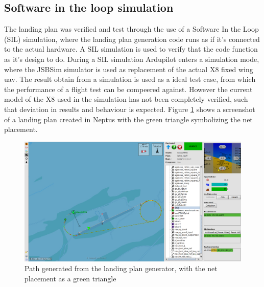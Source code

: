 \subsection{Software in the loop simulation}
The landing plan was verified and test through the use of a Software In the Loop (SIL) simulation, where the landing plan generation code runs as if it's connected to the actual hardware. A SIL simulation is used to verify that the code function as it's design to do. During a SIL simulation Ardupilot enters a simulation mode, where the JSBSim simulator is used as replacement of the actual X8 fixed wing \gls{uav}. The result obtain from a simulation is used as a ideal test case, from which the performance of a flight test can be compeered against. However the current model of the X8 used in the simulation has not been completely verified, such that deviation in results and behaviour is expected. Figure \ref{Fig:LandingPathNeptus} shows a screenshot of a landing plan created in Neptus with the green triangle symbolizing the net placement. 
\begin{figure}[H]
\centering
\includegraphics[scale=0.25]{figs/LandingPathNeptus.png}
\caption{Path generated from the landing plan generator, with the net placement as a green triangle}
\label{Fig:LandingPathNeptus}
\end{figure}
